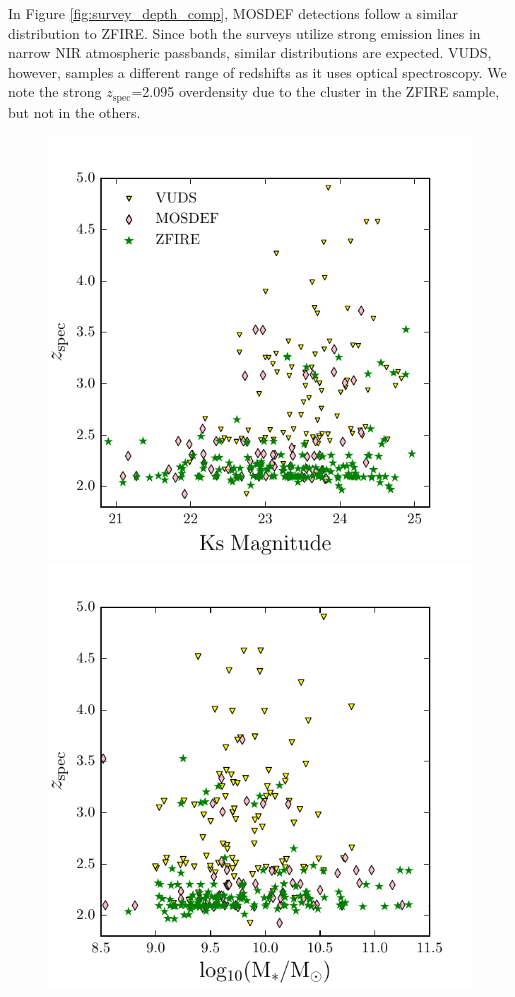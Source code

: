 \documentclass[iop]{emulateapj}
\newcommand{\zspec}{$z_{\mathrm{spec}}$}
\begin{document}
In Figure \ref{fig:survey_depth_comp}, MOSDEF detections follow a similar distribution to ZFIRE. Since both the surveys utilize strong emission lines in narrow NIR atmospheric passbands, similar distributions are expected.  VUDS, however, samples a different range of redshifts as it uses  optical spectroscopy. We note the strong \zspec=2.095 overdensity due to the cluster in the ZFIRE sample, but not in the others.  



\begin{figure}
\includegraphics[trim = 0 0 10 5, clip, scale=0.90]{figures/zspec_vs_Ks.pdf}
\includegraphics[trim = 0 0 10 5, clip, scale=0.90]{figures/zspec_vs_mass.pdf}

\end{figure}
\end{document}
